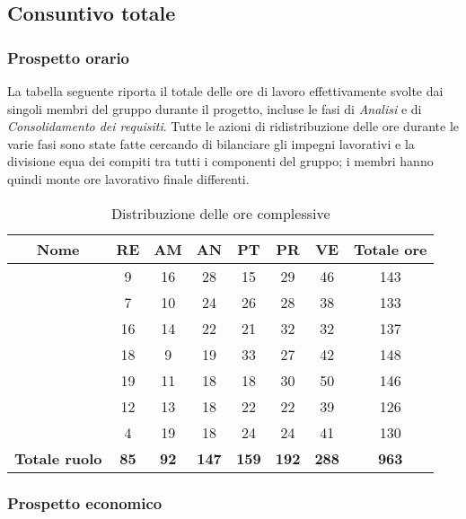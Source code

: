 \subsection{Consuntivo totale}

\subsubsection{Prospetto orario}
La tabella seguente riporta il totale delle ore di lavoro effettivamente svolte dai singoli membri del gruppo durante il progetto, incluse le fasi di \textit{Analisi} e di \textit{Consolidamento dei requisiti}. Tutte le azioni di ridistribuzione delle ore durante le varie fasi sono state fatte cercando di bilanciare gli impegni lavorativi e la divisione equa dei compiti tra tutti i componenti del gruppo; i membri hanno quindi monte ore lavorativo finale differenti.

\begin{table}[H]
		\begin{center}
			\setlength{\aboverulesep}{0pt}
			\setlength{\belowrulesep}{0pt}
			\setlength{\extrarowheight}{.75ex}
			\begin{tabular}{ c c c c c c c c }
				\rowcolor{AzzurroGruppo!30} 
				\textbf{Nome} & \textbf{RE} & \textbf{AM} & \textbf{AN} & \textbf{PT} & \textbf{PR} & \textbf{VE} & \textbf{Totale ore}\\
				\toprule
				\Davide{}    & 9 & 16 & 28 & 15 & 29 & 46 & 143 \\
				\Giosue{}    & 7 & 10 & 24 & 26 & 28 & 38 & 133\\
				\Francesco{} & 16 & 14 & 22 & 21 & 32 & 32 & 137\\
				\Daniele{}   & 18 & 9 & 19 & 33 & 27 & 42 & 148\\
				\Lucrezia{}  & 19 & 11 & 18 & 18 & 30 & 50 & 146\\
				\Matteo{}   & 12 & 13 & 18 & 22 & 22 & 39 & 126\\
				\Tommaso{}   & 4 & 19 & 18 & 24 & 24 & 41 & 130\\
				\textbf{Totale ruolo} & \textbf{85} & \textbf{92} & \textbf{147} & \textbf{159} & \textbf{192} & \textbf{288} & \textbf{963} \\
				\bottomrule
			\end{tabular}
			\caption{Distribuzione delle ore complessive}
		\end{center}
	\end{table}
	
\subsubsection{Prospetto economico}

